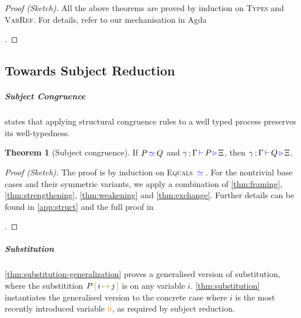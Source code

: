 \documentclass[sigplan,10pt,anonymous,review]{acmart}
\theoremstyle{definition}
\newtheorem{nitheorem}{Theorem}
\newcommand{\type}[1]{\textcolor{blue}{\operatorname{#1}}}
\newcommand{\constr}[1]{\textcolor{orange}{\operatorname{#1}}}
\newcommand{\func}[1]{\textcolor{olive}{\operatorname{#1}}}
\newcommand{\subst}[3]{#1 \, \func{[} \, #3 \, \func{\mapsto} \,#2 \, \func{]}}
\newcommand{\types}[4]{#1 \, \type{;} \, #2 \, \type{\vdash} \, #3 \, \type{\triangleright} \, #4}
\newcommand{\eq}[1]{\, \type{\simeq}_{#1} \,}
\begin{document}
\begin{proof}[Proof (Sketch)]
  All the above theorems are proved by induction on \textsc{Types} and \textsc{VarRef}.
  For details, refer to our mechanisation in Agda%
\begin{anonsuppress}
\cite{Zalakain2020Agda}
\end{anonsuppress}
.
\end{proof}

\subsection{Towards Subject Reduction}
\subparagraph*{Subject Congruence}
states that applying structural congruence rules to a well typed process preserves its well-typedness.

\begin{nitheorem}[Subject congruence]
  \label{thm:subject-congruence}
  If $P \eq{} Q$ and $\types{\gamma}{\Gamma}{P}{\Xi}$, then $\types{\gamma}{\Gamma}{Q}{\Xi}$.
\end{nitheorem}

\begin{proof}[Proof (Sketch)]
  The proof is by induction on \textsc{Equals} $\eq{}$.
  For the nontrivial base cases and their symmetric variants, we apply a combination of \autoref{thm:framing}, \autoref{thm:strengthening}, \autoref{thm:weakening} and \autoref{thm:exchange}.
  Further details can be found in \autoref{app:struct} and the full proof in%
\begin{anonsuppress}
\cite{Zalakain2020Agda}
\end{anonsuppress}
.
\end{proof}

\subparagraph*{Substitution}
\autoref{thm:substitution-generalization} proves a generalised version of substitution, where the substitition $\subst{P}{j}{i}$ is on any variable $i$.
\autoref{thm:substitution} instantiates the generalised version to the concrete case where $i$ is the most recently introduced variable $\constr{0}$, as required by subject reduction.
\end{document}
